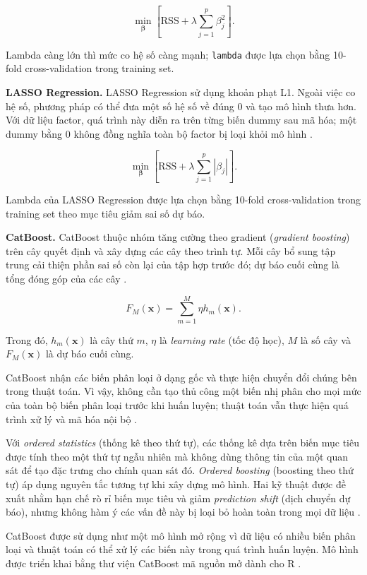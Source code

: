 \[
\min_{\boldsymbol{\beta}} \left[\mathrm{RSS} + \lambda \sum_{j=1}^{p}\beta_j^2\right].
\]

Lambda càng lớn thì mức co hệ số càng mạnh; \texttt{lambda} được lựa
chọn bằng 10-fold cross-validation trong training set.

\textbf{LASSO Regression.} LASSO Regression sử dụng khoản phạt L1. Ngoài
việc co hệ số, phương pháp có thể đưa một số hệ số về đúng 0 và tạo mô
hình thưa hơn. Với dữ liệu factor, quá trình này diễn ra trên từng biến
dummy sau mã hóa; một dummy bằng 0 không đồng nghĩa toàn bộ factor bị
loại khỏi mô hình \cite{james2021,hastie2015}.

\[
\min_{\boldsymbol{\beta}} \left[\mathrm{RSS} + \lambda \sum_{j=1}^{p}|\beta_j|\right].
\]

Lambda của LASSO Regression được lựa chọn bằng 10-fold cross-validation
trong training set theo mục tiêu giảm sai số dự báo.

\textbf{CatBoost.} CatBoost thuộc nhóm tăng cường theo gradient
(\emph{gradient boosting}) trên cây quyết định và xây dựng các cây theo
trình tự. Mỗi cây bổ sung tập trung cải thiện phần sai số còn lại của
tập hợp trước đó; dự báo cuối cùng là tổng đóng góp của các cây
\cite{prokhorenkova2018}.

\[
F_M(\mathbf{x}) = \sum_{m=1}^{M} \eta h_m(\mathbf{x}).
\]

Trong đó, \(h_m(\mathbf{x})\) là cây thứ \(m\), \(\eta\) là
\emph{learning rate} (tốc độ học), \(M\) là số cây và
\(F_M(\mathbf{x})\) là dự báo cuối cùng.

CatBoost nhận các biến phân loại ở dạng gốc và thực hiện chuyển đổi
chúng bên trong thuật toán. Vì vậy, không cần tạo thủ công một biến nhị
phân cho mọi mức của toàn bộ biến phân loại trước khi huấn luyện; thuật
toán vẫn thực hiện quá trình xử lý và mã hóa nội bộ
\cite{prokhorenkova2018,catboost_docs}.

Với \emph{ordered statistics} (thống kê theo thứ tự), các thống kê dựa
trên biến mục tiêu được tính theo một thứ tự ngẫu nhiên mà không dùng
thông tin của một quan sát để tạo đặc trưng cho chính quan sát đó.
\emph{Ordered boosting} (boosting theo thứ tự) áp dụng nguyên tắc tương
tự khi xây dựng mô hình. Hai kỹ thuật được đề xuất nhằm hạn chế rò rỉ
biến mục tiêu và giảm \emph{prediction shift} (dịch chuyển dự báo),
nhưng không hàm ý các vấn đề này bị loại bỏ hoàn toàn trong mọi dữ liệu
\cite{prokhorenkova2018}.

CatBoost được sử dụng như một mô hình mở rộng vì dữ liệu có nhiều biến
phân loại và thuật toán có thể xử lý các biến này trong quá trình huấn
luyện. Mô hình được triển khai bằng thư viện CatBoost mã nguồn mở dành
cho R \cite{catboost_docs}.

